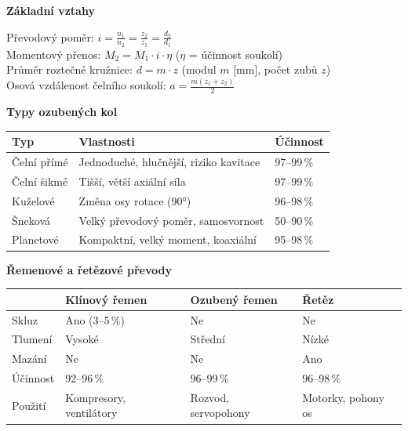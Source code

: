 \documentclass[a4paper,10pt]{article}
\begin{document}
\begin{vysvetlenibox}
\textbf{Základní vztahy}

\begin{vzorcebox}
Převodový poměr: $i = \frac{n_1}{n_2} = \frac{z_2}{z_1} = \frac{d_2}{d_1}$\\
Momentový přenos: $M_2 = M_1 \cdot i \cdot \eta$
\quad ($\eta$ = účinnost soukolí)\\
Průměr roztečné kružnice: $d = m \cdot z$
\quad (modul $m$ [mm], počet zubů $z$)\\
Osová vzdálenost čelního soukolí:
$a = \frac{m(z_1 + z_2)}{2}$
\end{vzorcebox}

\textbf{Typy ozubených kol}

\begin{center}
\begin{tabularx}{0.95\linewidth}{@{} l X l @{}}
    \toprule
    \textbf{Typ} & \textbf{Vlastnosti} & \textbf{Účinnost} \\
    \midrule
    Čelní přímé    & Jednoduché, hlučnější, riziko kavitace & 97--99\,\% \\
    Čelní šikmé    & Tišší, větší axiální síla & 97--99\,\% \\
    Kuželové       & Změna osy rotace (90°) & 96--98\,\% \\
    Šneková        & Velký převodový poměr, samosvornost & 50--90\,\% \\
    Planetové      & Kompaktní, velký moment, koaxiální & 95--98\,\% \\
    \bottomrule
\end{tabularx}
\end{center}

\textbf{Řemenové a řetězové převody}

\begin{center}
\begin{tabularx}{0.95\linewidth}{@{} l X X X @{}}
    \toprule
    & \textbf{Klínový řemen} & \textbf{Ozubený řemen}
    & \textbf{Řetěz} \\
    \midrule
    Skluz      & Ano (3--5\,\%) & Ne & Ne \\
    Tlumení    & Vysoké & Střední & Nízké \\
    Mazání     & Ne & Ne & Ano \\
    Účinnost   & 92--96\,\% & 96--99\,\% & 96--98\,\% \\
    Použití    & Kompresory, ventilátory & Rozvod, servopohony
               & Motorky, pohony os \\
    \bottomrule
\end{tabularx}
\end{center}


\end{vysvetlenibox}
\end{document}
